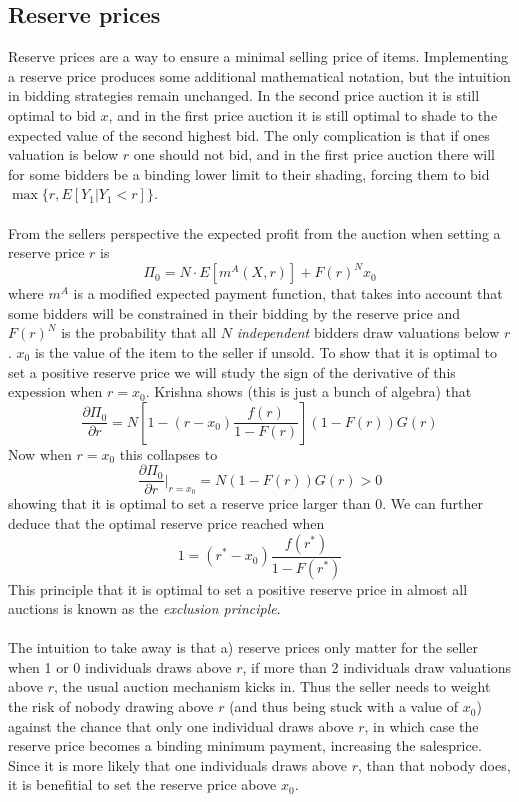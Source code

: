 \subsection{Reserve prices}
Reserve prices are a way to ensure a minimal selling price of items. Implementing a reserve price produces some additional mathematical notation, but the intuition in bidding strategies remain unchanged. In the second price auction it is still optimal to bid $x$, and in the first price auction it is still optimal to shade to the expected value of the second highest bid. The only complication is that if ones valuation is below $r$ one should not bid, and in the first price auction there will for some bidders be a binding lower limit to their shading, forcing them to bid $\max\{r, E[Y_1 | Y_1 < r]\}$.
\\ \\
From the sellers perspective the expected profit from the auction when setting a reserve price $r$ is
\begin{equation}
  \Pi_0 = N \cdot E[m^A(X,r)] + F(r)^{N} x_0
\end{equation}
where $m^A$ is a modified expected payment function, that takes into account that some bidders will be constrained in their bidding by the reserve price and $F(r)^N$ is the probability that all $N$ \textit{independent} bidders draw valuations below $r$. $x_0$ is the value of the item to the seller if unsold. To show that it is optimal to set a positive reserve price we will study the sign of the derivative of this expession when $r=x_0$. Krishna shows (this is just a bunch of algebra) that
\begin{equation}
  \frac{\partial \Pi_0}{\partial r} = N\left[1 - (r- x_0)\frac{f(r)}{1-F(r)}\right](1-F(r))G(r)
\end{equation}
Now when $r=x_0$ this collapses to
\begin{equation}
  \frac{\partial \Pi_0}{\partial r}\bigg|_{r=x_0} = N(1-F(r))G(r) > 0
\end{equation}
showing that it is optimal to set a reserve price larger than $0$. We can further deduce that the optimal reserve price reached when
\begin{equation}
  1 = (r^* - x_0) \frac{f(r^*)}{1-F(r^*)}
\end{equation}
This principle that it is optimal to set a positive reserve price in almost all auctions is known as the \textit{exclusion principle}.
\\ \\
The intuition to take away is that a) reserve prices only matter for the seller when 1 or 0 individuals draws above $r$, if more than 2 individuals draw valuations above $r$, the usual auction mechanism kicks in. Thus the seller needs to weight the risk of nobody drawing above $r$ (and thus being stuck with a value of $x_0$) against the chance that only one individual draws above $r$, in which case the reserve price becomes a binding minimum payment, increasing the salesprice. Since it is more likely that one individuals draws above $r$, than that nobody does, it is benefitial to set the reserve price above $x_0$.

